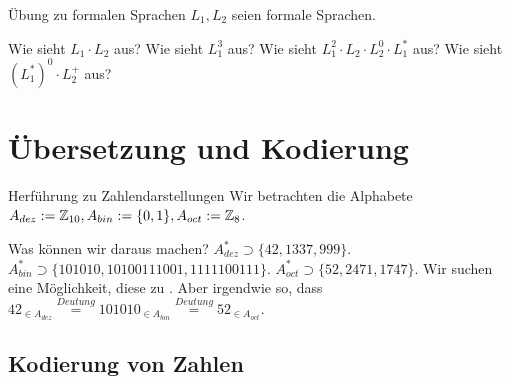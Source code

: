 \begin{frame}{Übung zu formalen Sprachen}
	$L_1, L_2$ seien formale Sprachen.
	\begin{itemize}
		\pitem Wie sieht $L_1 \cdot L_2$ aus?
		\pitem Wie sieht $L_1^3$ aus?
		\pitem Wie sieht $L_1^2 \cdot L_2 \cdot L_2^0 \cdot L_1^*$ aus?
		\pitem Wie sieht $(L_1^*)^0 \cdot L_2^+$ aus?
	\end{itemize}	
\end{frame}



\section{Übersetzung und Kodierung}

\begin{frame}{Herführung zu Zahlendarstellungen}
	\pause Wir betrachten die Alphabete $A_{dez} := \mathbb{Z}_{10}, A_{bin} := \{0, 1\}, A_{oct} := \mathbb{Z}_8$.
	\begin{itemize}
		\pitem Was können wir daraus machen?
		\pitem $A_{dez}^* \supset \{42, 1337, 999\}$.
		\pitem $A_{bin}^* \supset \{101010, 10100111001, 1111100111\}$.
		\pitem $A_{oct}^* \supset \{52, 2471, 1747\}$.
		\pitem Wir suchen eine Möglichkeit, diese  zu \markGreen{deuten}.
		\pitem Aber irgendwie so, dass $42_{\in A_{dez}} \stackrel{Deutung}{=} 101010_{\in A_{bin}} \stackrel{Deutung}{=} 52_{\in A_{oct}}$.
	\end{itemize}
\end{frame}

\subsection{Kodierung von Zahlen}

